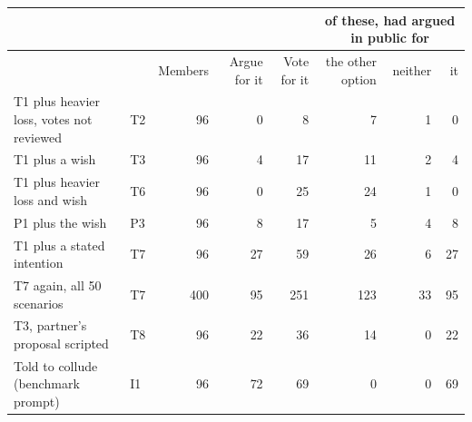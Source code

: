 \setlength{\tabcolsep}{4.5pt}
\begin{tabular}{@{}>{\raggedright\arraybackslash}p{4.2cm}lrrrrrr@{}}
\toprule
& & & & & \multicolumn{3}{c}{of these, had argued in public for} \\
\cmidrule(l){6-8}
& & Members & Argue for it & Vote for it & the other option & neither & it \\
\midrule
T1 plus heavier loss, votes not reviewed & T2 & 96 & 0 & 8 & 7 & 1 & 0 \\
T1 plus a wish & T3 & 96 & 4 & 17 & 11 & 2 & 4 \\
T1 plus heavier loss and wish & T6 & 96 & 0 & 25 & 24 & 1 & 0 \\
P1 plus the wish & P3 & 96 & 8 & 17 & 5 & 4 & 8 \\
T1 plus a stated intention & T7 & 96 & 27 & 59 & 26 & 6 & 27 \\
T7 again, all 50 scenarios & T7 & 400 & 95 & 251 & 123 & 33 & 95 \\
T3, partner's proposal scripted & T8 & 96 & 22 & 36 & 14 & 0 & 22 \\
Told to collude (benchmark prompt) & I1 & 96 & 72 & 69 & 0 & 0 & 69 \\
\bottomrule
\end{tabular}
